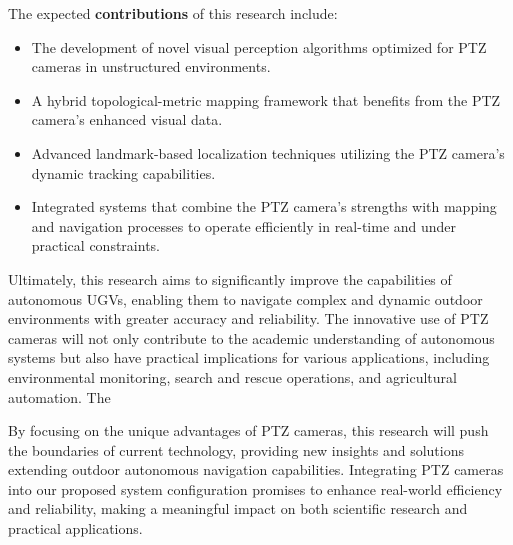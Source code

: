 \documentclass[runningheads]{llncs}
\makeatletter
\renewcommand\paragraph{\@startsection{paragraph}{4}{\z@}%
                                    {2.25ex \@plus1ex \@minus.2ex}%
                                    {-1em}%
                                    {\normalfont\normalsize\bfseries}}
\makeatother
\begin{document}
The expected \textbf{contributions} of this research include:

\begin{itemize}
\item The development of novel visual perception algorithms optimized for PTZ cameras in unstructured environments.
\item A hybrid topological-metric mapping framework that benefits from the PTZ camera's enhanced visual data.
\item Advanced landmark-based localization techniques utilizing the PTZ camera's dynamic tracking capabilities.
\item Integrated systems that combine the PTZ camera's strengths with mapping and navigation processes to operate efficiently in real-time and under practical constraints.
\end{itemize}

Ultimately, this research aims to significantly improve the capabilities of autonomous UGVs, enabling them to navigate complex and dynamic outdoor environments with greater accuracy and reliability. The innovative use of PTZ cameras will not only contribute to the academic understanding of autonomous systems but also have practical implications for various applications, including environmental monitoring, search and rescue operations, and agricultural automation. The

By focusing on the unique advantages of PTZ cameras, this research will push the boundaries of current technology, providing new insights and solutions extending outdoor autonomous navigation capabilities. Integrating PTZ cameras into our proposed system configuration promises to enhance real-world efficiency and reliability, making a meaningful impact on both scientific research and practical applications.








%
%

\printbibliography
\end{document}
